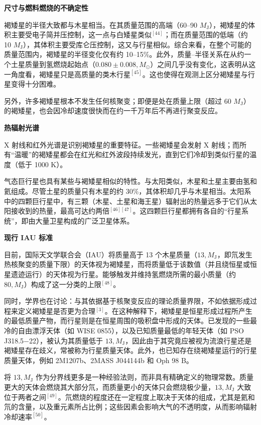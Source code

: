 \textbf{尺寸与燃料燃烧的不确定性}

褐矮星的半径大致都与木星相当。在其质量范围的高端（60–90 $M_{\mathrm{J}}$），褐矮星的体积主要受电子简并压控制，这一点与白矮星类似$^{[44]}$；而在质量范围的低端（约 10 $M_{\mathrm{J}}$），其体积主要受库仑压控制，这又与行星相似。综合来看，在整个可能的质量范围内，褐矮星的半径变化仅有约 10–15\%。此外，质量–半径关系在从约一个土星质量到氢燃烧起始点（$0.080\pm0.008,M_\odot$）之间几乎没有变化，这表明从这一角度看，褐矮星只是高质量的类木行星$^{[45]}$。这也使得在观测上区分褐矮星与行星变得十分困难。

另外，许多褐矮星根本不发生任何核聚变；即便是处在质量上限（超过 60 $M_{\mathrm{J}}$）的褐矮星，也会因冷却速度很快而在约一千万年后不再进行聚变反应。

\textbf{热辐射光谱}

X 射线和红外光谱是识别褐矮星的重要特征。一些褐矮星会发射 X 射线；而所有“温暖”的褐矮星都会在红光和红外波段持续发光，直到它们冷却到类似行星的温度（低于 1000 K）。

气态巨行星也具有某些与褐矮星相似的特性。与太阳类似，木星和土星主要由氢和氦组成。尽管土星的质量只有木星的约 30\%，其体积却几乎与木星相当。太阳系中的四颗巨行星中，有三颗（木星、土星和海王星）辐射出的热量远多于它们从太阳接收到的热量，最高可达约两倍$^{[46][47]}$。这四颗巨行星都拥有各自的“行星系统”，即由大量卫星构成的广泛卫星体系。

\textbf{现行 IAU 标准}

目前，国际天文学联合会（IAU）将质量高于 13 个木星质量（$13,M_{\mathrm{J}}$，即氘发生热核聚变的质量下限）的天体视为褐矮星，而将质量低于该数值（并且绕恒星或恒星遗迹运行）的天体视为行星。能够触发并维持氢燃烧所需的最小质量（约 $80,M_{\mathrm{J}}$）构成了这一分类的上限$^{[48]}$。

同时，学界也在讨论：与其依据基于核聚变反应的理论质量界限，不如依据形成过程来定义褐矮星是否更为合理$^{[3]}$。在这种解释下，褐矮星是恒星形成过程所产生的最低质量产物，而行星则是在恒星周围的吸积盘中形成的天体。已发现的一些最冷的自由漂浮天体（如 WISE 0855），以及已知质量最低的年轻天体（如 PSO J318.5−22），被认为其质量低于 $13,M_{\mathrm{J}}$，因此由于其究竟应被视为流浪行星还是褐矮星存在歧义，常被称为行星质量天体。此外，也已知存在绕褐矮星运行的行星质量天体，例如 2M1207b、2MASS J044144b 和 Oph 98 B。

将 $13,M_{\mathrm{J}}$ 作为分界线更多是一种经验法则，而非具有精确定义的物理常数。质量更大的天体会燃烧其大部分氘，而质量更小的天体只会燃烧极少量，$13,M_{\mathrm{J}}$ 大致位于两者之间$^{[49]}$。氘燃烧的程度还在一定程度上取决于天体的组成，尤其是氦和氘的含量，以及重元素所占比例；这些因素会影响大气的不透明度，从而影响辐射冷却速率$^{[50]}$。

